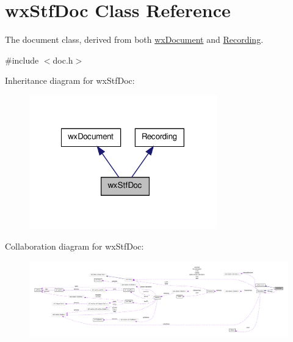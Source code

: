 \hypertarget{classwxStfDoc}{
\section{wxStfDoc Class Reference}
\label{classwxStfDoc}
}


The document class, derived from both \hyperlink{classwxDocument}{wxDocument} and \hyperlink{classRecording}{Recording}.  




{\ttfamily \#include $<$doc.h$>$}



Inheritance diagram for wxStfDoc:
\nopagebreak
\begin{figure}[H]
\begin{center}
\leavevmode
\includegraphics[width=230pt]{classwxStfDoc__inherit__graph}
\end{center}
\end{figure}


Collaboration diagram for wxStfDoc:
\nopagebreak
\begin{figure}[H]
\begin{center}
\leavevmode
\includegraphics[width=400pt]{classwxStfDoc__coll__graph}
\end{center}
\end{figure}

